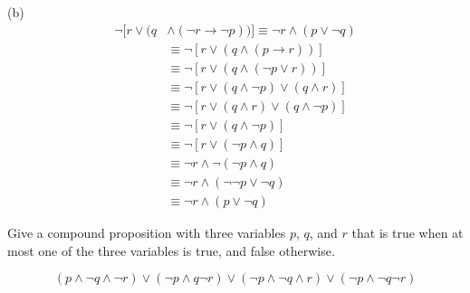 \documentclass[12pt,addpoints]{exam}
\newcommand{\ra}{\rightarrow}
\begin{document}
\begin{questions}
\begin{solution}
    (b)
    \begin{align*} 
      \neg [ r \vee (q & \wedge (\neg r \ra \neg p))] \equiv \neg r \wedge (p \vee \neg q) \\
        & \equiv \neg [r \vee (q \wedge (p \ra r))] \tag{Table 7, rule 2} \\
        & \equiv \neg [r \vee (q \wedge (\neg p \vee r))] \tag{Table 7, rule 1} \\
        & \equiv \neg [r \vee (q \wedge \neg p) \vee (q \wedge r)] \tag{Distributive} \\
        & \equiv \neg [r \vee (q \wedge r) \vee (q \wedge \neg p)] \tag{Commutative} \\
        & \equiv \neg [r \vee (q \wedge \neg p)] \tag{Absorption} \\
        & \equiv \neg [r \vee (\neg p \wedge q)] \tag{Commutative} \\
        & \equiv \neg r \wedge \neg (\neg p \wedge q) \tag{DeMorgan's} \\
        & \equiv \neg r \wedge (\neg \neg p \vee \neg q) \tag{DeMorgan's} \\
        & \equiv \neg r \wedge (p \vee \neg q) \tag{Double Negation} 
    \end{align*}
    \end{solution}

\bonusquestion[2] Give a compound proposition with three variables $p$, $q$, and $r$ that is 
true when at most one of the three variables is true, and false otherwise.
    \begin{solution}
    \[ (p \wedge \neg q \wedge \neg r) \vee (\neg p \wedge q \neg r) 
        \vee (\neg p \wedge \neg q \wedge r) \vee (\neg p \wedge \neg q \neg r)\]
    \end{solution}
\end{questions}
\end{document}
